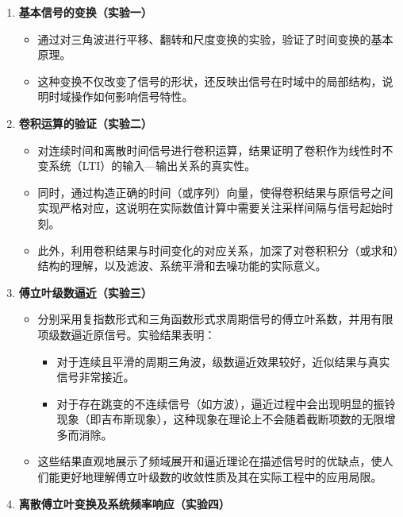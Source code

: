 \documentclass[12pt,a4paper,UTF8]{article}
\providecommand{\tightlist}{%
      \setlength{\itemsep}{0pt}\setlength{\parskip}{0pt}}
\begin{document}
\begin{enumerate}
\def\labelenumi{\arabic{enumi}.}
\item
  \textbf{基本信号的变换（实验一）}

  \begin{itemize}
  \item
    通过对三角波进行平移、翻转和尺度变换的实验，验证了时间变换的基本原理。
  \item
    这种变换不仅改变了信号的形状，还反映出信号在时域中的局部结构，说明时域操作如何影响信号特性。
  \end{itemize}
\item
  \textbf{卷积运算的验证（实验二）}

  \begin{itemize}
  \tightlist
  \item
    对连续时间和离散时间信号进行卷积运算，结果证明了卷积作为线性时不变系统（LTI）的输入---输出关系的真实性。\\
  \item
    同时，通过构造正确的时间（或序列）向量，使得卷积结果与原信号之间实现严格对应，这说明在实际数值计算中需要关注采样间隔与信号起始时刻。\\
  \item
    此外，利用卷积结果与时间变化的对应关系，加深了对卷积积分（或求和）结构的理解，以及滤波、系统平滑和去噪功能的实际意义。
  \end{itemize}
\item
  \textbf{傅立叶级数逼近（实验三）}

  \begin{itemize}
  \tightlist
  \item
    分别采用复指数形式和三角函数形式求周期信号的傅立叶系数，并用有限项级数逼近原信号。实验结果表明：

    \begin{itemize}
    \tightlist
    \item
      对于连续且平滑的周期三角波，级数逼近效果较好，近似结果与真实信号非常接近。\\
    \item
      对于存在跳变的不连续信号（如方波），逼近过程中会出现明显的振铃现象（即吉布斯现象），这种现象在理论上不会随着截断项数的无限增多而消除。\\
    \end{itemize}
  \item
    这些结果直观地展示了频域展开和逼近理论在描述信号时的优缺点，使人们能更好地理解傅立叶级数的收敛性质及其在实际工程中的应用局限。
  \end{itemize}
\item
  \textbf{离散傅立叶变换及系统频率响应（实验四）}


\end{enumerate}
\end{document}
